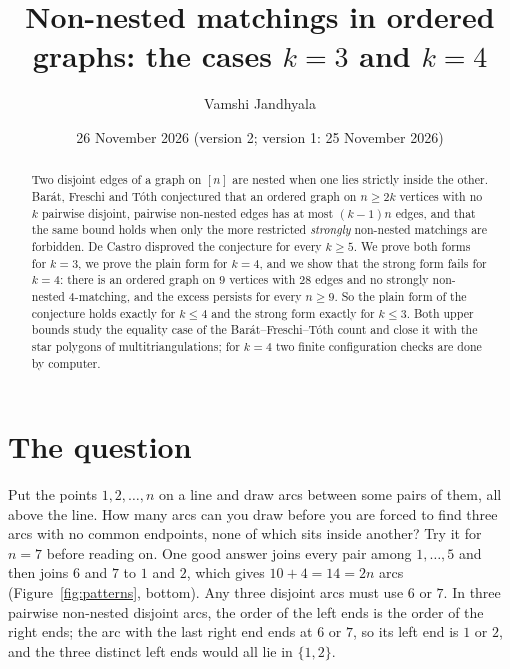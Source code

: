 \documentclass[11pt]{amsart}
\title{Non-nested matchings in ordered graphs: the cases $k=3$ and $k=4$}
\author{Vamshi Jandhyala}
\date{26 November 2026 (version 2; version 1: 25 November 2026)}
\theoremstyle{definition}\newtheorem{problem}{Problem}
\theoremstyle{remark}\newtheorem*{remark}{Remark}
\begin{document}
\begin{abstract}
Two disjoint edges of a graph on $[n]$ are nested when one lies strictly inside the other. Bar\'at, Freschi and
T\'oth conjectured that an ordered graph on $n\ge 2k$ vertices with no $k$ pairwise disjoint, pairwise non-nested
edges has at most $(k-1)n$ edges, and that the same bound holds when only the more restricted \emph{strongly}
non-nested matchings are forbidden. De Castro disproved the conjecture for every $k\ge5$. We prove both forms for
$k=3$, we prove the plain form for $k=4$, and we show that the strong form fails for $k=4$: there is an ordered graph
on $9$ vertices with $28$ edges and no strongly non-nested $4$-matching, and the excess persists for every $n\ge9$.
So the plain form of the conjecture holds exactly for $k\le4$ and the strong form exactly for $k\le3$. Both upper
bounds study the equality case of the Bar\'at--Freschi--T\'oth count and close it with the star polygons of
multitriangulations; for $k=4$ two finite configuration checks are done by computer.
\end{abstract}
\maketitle

\section{The question}
Put the points $1,2,\dots,n$ on a line and draw arcs between some pairs of them, all above the line. How many arcs can
you draw before you are forced to find three arcs with no common endpoints, none of which sits inside another? Try it
for $n=7$ before reading on. One good answer joins every pair among $1,\dots,5$ and then joins $6$ and $7$ to $1$ and
$2$, which gives $10+4=14=2n$ arcs (Figure~\ref{fig:patterns}, bottom). Any three disjoint arcs must use $6$ or $7$.
In three pairwise non-nested disjoint arcs, the order of the left ends is the order of the right ends; the arc with the
last right end ends at $6$ or $7$, so its left end is $1$ or $2$, and the three distinct left ends would all lie in
$\{1,2\}$.
\end{document}
